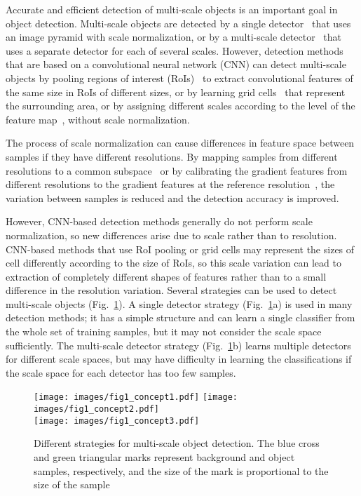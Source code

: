 \documentclass[runningheads]{llncs}
\begin{document}
Accurate and efficient detection of multi-scale objects is an important goal in object detection.
Multi-scale objects are detected by a single detector~\cite{dalal2005histograms,dollar2014fast,dollar2009integral,viola2004robust} that uses an image pyramid with scale normalization,
or by a multi-scale detector~\cite{benenson2012pedestrian} that uses a separate detector for each of several scales.
However, detection methods that are based on a convolutional neural network (CNN) can detect multi-scale objects by pooling regions of interest (RoIs)~\cite{girshick2015fast,li2016r,ren2015faster} to extract convolutional features of the same size in RoIs of different sizes,
or by learning grid cells~\cite{redmon2016you,redmon2017yolo9000} that represent the surrounding area, or by assigning different scales according to the level of the feature map~\cite{lin2017feature,liu2016ssd}, without scale normalization.


The process of scale normalization can cause differences in feature space between samples if they have different resolutions.
By mapping samples from different resolutions to a common subspace~\cite{yan2013robust} or by calibrating the gradient features from different resolutions to the gradient features at the reference resolution~\cite{detector2017icip},
the variation between samples is reduced and the detection accuracy is improved.


However, CNN-based detection methods generally do not perform scale normalization,
so new differences arise due to scale rather than to resolution.
CNN-based methods that use RoI pooling or grid cells may represent the sizes of cell differently according to the size of RoIs,
so this scale variation can lead to extraction of completely different shapes of features rather than to a small difference in the resolution variation.
Several strategies can be used to detect multi-scale objects (Fig.~\ref{fig:SAN_CONCEPTS}).
A single detector strategy (Fig.~\ref{fig:SAN_CONCEPTS}a) is used in many detection methods; it has a simple structure and can learn a single classifier from the whole set of training samples,
but it may not consider the scale space sufficiently.
The multi-scale detector strategy (Fig.~\ref{fig:SAN_CONCEPTS}b) learns multiple detectors for different scale spaces,
but may have difficulty in learning the classifications if the scale space for each detector has too few samples.



\begin{figure}[t]
	\texttt{[image: images/fig1\_concept1.pdf]}
	\texttt{[image: images/fig1\_concept2.pdf]}\\
	\texttt{[image: images/fig1\_concept3.pdf]}
	\caption{Different strategies for multi-scale object detection. The blue cross and green triangular marks represent background and object samples, respectively, and the size of the mark is proportional to the size of the sample}
	\centering
	\label{fig:SAN_CONCEPTS}
\end{figure}
\end{document}
